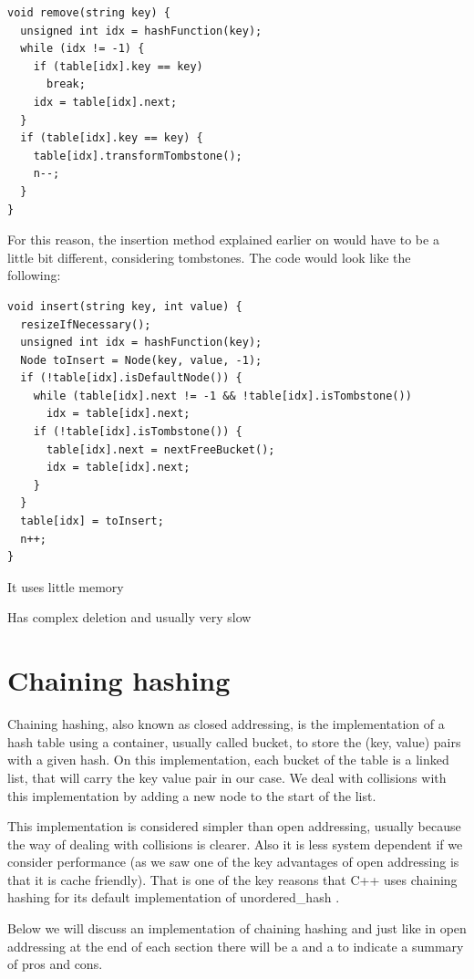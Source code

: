 \newpage

\begin{lstlisting}
void remove(string key) {
  unsigned int idx = hashFunction(key);
  while (idx != -1) {
    if (table[idx].key == key) 
      break;
    idx = table[idx].next;         
  }
  if (table[idx].key == key) {
    table[idx].transformTombstone();
    n--;
  }
}
\end{lstlisting}

For this reason, the insertion method explained earlier on would have to be a little bit different, considering tombstones. The code would look like the following:

\begin{lstlisting}
void insert(string key, int value) {
  resizeIfNecessary();
  unsigned int idx = hashFunction(key);
  Node toInsert = Node(key, value, -1);
  if (!table[idx].isDefaultNode()) {
    while (table[idx].next != -1 && !table[idx].isTombstone())
      idx = table[idx].next; 
    if (!table[idx].isTombstone()) {
      table[idx].next = nextFreeBucket();
      idx = table[idx].next;
    }
  }
  table[idx] = toInsert;
  n++;
}
\end{lstlisting}

\rightthumbsup It uses little memory

\rightthumbsdown Has complex deletion and usually very slow

\section{Chaining hashing}

Chaining hashing, also known as closed addressing, is the implementation of a hash table using a container, usually called bucket, to store the (key, value) pairs with a given hash. On this implementation, each bucket of the table is a linked list, that will carry the key value pair in our case. We deal with collisions with this implementation by adding a new node to the start of the list.

This implementation is considered simpler than open addressing, usually because the way of dealing with collisions is clearer. Also it is less system dependent if we consider performance (as we saw one of the key advantages of open addressing is that it is cache friendly). That is one of the key reasons that C++ uses chaining hashing for its default implementation of unordered\_hash \citep{HashTableProposal}.

Below we will discuss an implementation of chaining hashing and just like in open addressing at the end of each section there will be a \rightthumbsup and a \rightthumbsdown to indicate a summary of pros and cons.

